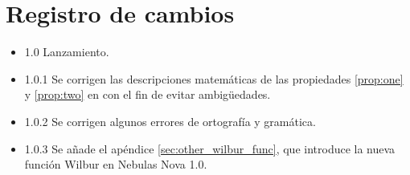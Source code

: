 \section{Registro de cambios}
\begin{itemize}
\item{1.0} Lanzamiento.
\item{1.0.1} Se corrigen las descripciones matemáticas de las propiedades \ref{prop:one} y \ref{prop:two} en  con el fin de evitar ambigüedades.
\item{1.0.2} Se corrigen algunos errores de ortografía y gramática.
\item{1.0.3} Se añade el apéndice \ref{sec:other_wilbur_func}, que introduce la nueva función Wilbur en Nebulas Nova 1.0.
\end{itemize}